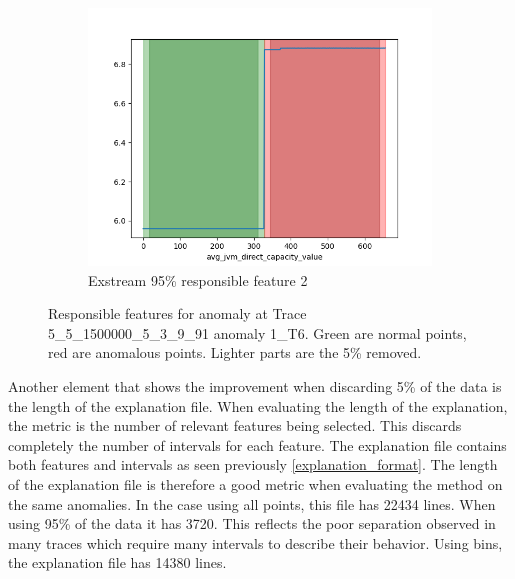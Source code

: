 \documentclass[oneside, a4paper, onecolumn, 11pt]{article}
\begin{document}
\begin{figure}[H]
\begin{subfigure}{0.3\textwidth}
      \includegraphics[width=\linewidth]{images/ex_remove52.png}
      \caption{Exstream 95\% responsible feature 2}
  \end{subfigure}
  \caption{Responsible features for anomaly at Trace 5\_5\_1500000\_5\_3\_9\_91 anomaly 1\_T6. Green are normal points, red are anomalous points. Lighter parts are the 5\% removed.}
\end{figure}
Another element that shows the improvement when discarding 5\% of the data is the length of the explanation file. When evaluating the length of the explanation, the metric is the number of relevant features being selected. This discards completely the number of intervals for each feature. The explanation file contains both features and intervals as seen previously \autoref{explanation_format}. The length of the explanation file is therefore a good metric when evaluating the method on the same anomalies. In the case using all points, this file has 22434 lines. When using 95\% of the data it has 3720. This reflects the poor separation observed in many traces which require many intervals to describe their behavior. Using bins, the explanation file has 14380 lines.\\
\end{document}
